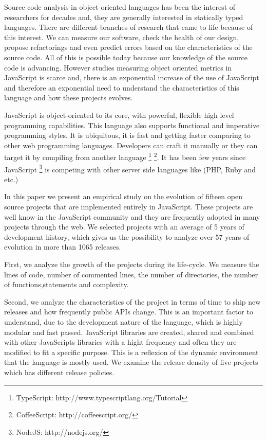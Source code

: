 
Source code analysis in object oriented languages has been the interest of researchers for decades and, they are generally interested in statically typed languages. There are different branches of research that came to life because of this interest. We can measure our software, check the health of our design, propose refactorings and even predict errors based on the characteristics of the source code. All of this is possible today because our knowledge of the source code is advancing.  However studies measuring object oriented metrics in JavaScript is scarce \cite{Richards:2010:ADB:1809028.1806598 , 6320536} and, there is an exponential increase of the use of JavaScript and therefore an exponential need to understand the characteristics of this language and how these projects evolves.

JavaScript is object-oriented to its core, with powerful, flexible high level programming capabilities. This language also supports functional and imperative programming styles. It is ubiquitous, it is fast and getting faster comparing to other web programming languages. Developers can craft it manually or they can target it by compiling from another language \footnote{TypeScript: http://www.typescriptlang.org/Tutorial} \footnote{CoffeeScript: http://coffeescript.org/}. It has been few years since JavaScript \footnote{NodeJS: http://nodejs.org/} is competing with other server side languages like (PHP, Ruby and etc.)

In this paper we present an empirical study on the evolution of fifteen open source projects that are implemented entirely in JavaScript. These projects are well know in the JavaScript community and they are frequently adopted in many projects through the web. We selected projects with an average of 5 years of development history, which gives us the possibility to analyze over 57 years of evolution in more than 1065 releases. 

First, we analyze the growth of the projects during its life-cycle. We measure the lines of code, number of commented lines, the number of directories, the number of functions,statements and complexity. 

Second, we analyze the characteristics of the project in terms of time to ship new releases and how frequently public APIs change. This is an important factor to understand, due to the development nature of the language, which is highly modular and fast passed. JavaScript libraries are created, shared and combined with other JavaScripts libraries with a hight frequency and often they are modified to fit a specific purpose. This is a reflexion of the dynamic environment that the language is mostly used. We examine the release density of five projects which has different release policies. 

